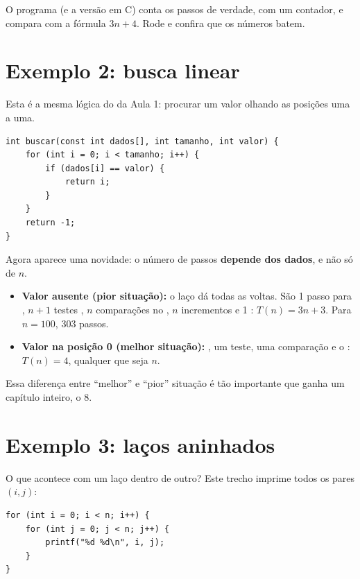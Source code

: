 \begin{dica}
O programa  (e a versão em C) conta os passos de verdade,
com um contador, e compara com a fórmula $3n + 4$. Rode e confira que os números batem.
\end{dica}

\section{Exemplo 2: busca linear}

Esta é a mesma lógica do  da Aula 1: procurar um valor olhando as
posições uma a uma.

\begin{lstlisting}[style=c]
int buscar(const int dados[], int tamanho, int valor) {
    for (int i = 0; i < tamanho; i++) {
        if (dados[i] == valor) {
            return i;
        }
    }
    return -1;
}
\end{lstlisting}

Agora aparece uma novidade: o número de passos \textbf{depende dos dados}, e não só de $n$.

\begin{itemize}
  \item \textbf{Valor ausente (pior situação):} o laço dá todas as voltas. São 1 passo para
        , $n + 1$ testes , $n$ comparações no , $n$
        incrementos e 1 : $T(n) = 3n + 3$. Para $n = 100$, 303 passos.
  \item \textbf{Valor na posição 0 (melhor situação):} , um teste, uma comparação
        e o : $T(n) = 4$, qualquer que seja $n$.
\end{itemize}

Essa diferença entre \enquote{melhor} e \enquote{pior} situação é tão importante que ganha um
capítulo inteiro, o 8.

\section{Exemplo 3: laços aninhados}

O que acontece com um laço dentro de outro? Este trecho imprime todos os pares $(i, j)$:

\begin{lstlisting}[style=c]
for (int i = 0; i < n; i++) {
    for (int j = 0; j < n; j++) {
        printf("%d %d\n", i, j);
    }
}
\end{lstlisting}

